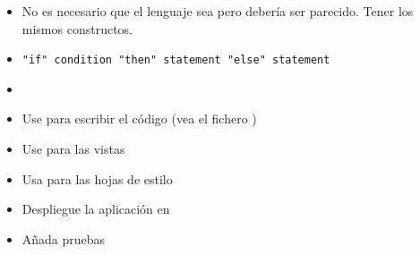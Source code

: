 \begin{itemize}
\begin{itemize}
Así pues una técnica es eliminar la recursión por la izquierda en
\verb#expression -> expression ADDOP term | term#
 por su equivalente
 \verb|expression -> term (ADDOP term)*| e implantarlo
mediante un bucle en el que se va construyendo el árbol de análisis 
sintáctico abstracto (AST) de manera que se asocie a izquierdas:
\begin{verbatim}
 expression = ->
    result = term()
    while lookahead and lookahead.type is "ADDOP"
      type = lookahead.value
      match "ADDOP"
      right = term()
      result =
        type: type
        left: result
        right: right
    result
\end{verbatim}
Aquí el token \verb|ADDOP| esta por las dos operaciones aditivas:
\begin{verbatim}
 tokens =
    WHITES: /\s+/g
    ID: /[a-zA-Z_]\w*/g
    NUM: /\b\d+(\.\d*)?([eE][+-]?\d+)?\b/g
    STRING: /('(\\.|[^'])*'|"(\\.|[^"])*")/g
    ONELINECOMMENT: /\/\/.*/g
    MULTIPLELINECOMMENT: /\/[*](.|\n)*?[*]\//g
    COMPARISONOPERATOR: /[<>=!]=|[<>]/g
    ADDOP: /[+-]/g
    ONECHAROPERATORS: /([*\/=()&|;:,{}[\]])/g
\end{verbatim}
\end{itemize}
\item
No es necesario que el lenguaje sea  pero debería 
ser parecido. Tener
los mismos constructos.
\item
{} \verb|"if" condition "then" statement "else" statement|
\item
\item
Use \coffeescript{} para escribir el código (vea el fichero
)
\item
Use 
para las vistas
\item
Usa \sass{} para las hojas de estilo
\item
Despliegue la aplicación en \Heroku{}
\item Añada pruebas
\end{itemize}

